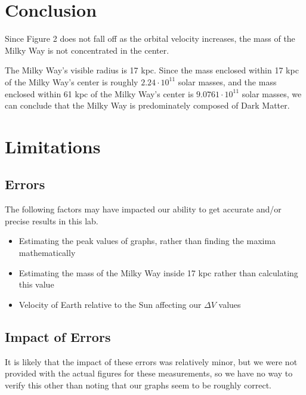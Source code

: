 \documentclass{article}
\begin{document}
\pagebreak

\section{Conclusion}

Since Figure 2 does not fall off as the orbital velocity increases, the mass of the Milky Way is not concentrated in the center.

The Milky Way's visible radius is 17 kpc.
Since the mass enclosed within 17 kpc of the Milky Way's center is roughly $2.24 \cdot 10^{11}$ solar masses, and the mass enclosed within 61 kpc of the Milky Way's center is $9.0761 \cdot 10^{11}$ solar masses, we can conclude that the Milky Way is predominately composed of Dark Matter.

\section{Limitations}

\subsection{Errors}
The following factors may have impacted our ability to get accurate and/or
precise results in this lab.

\begin{itemize}
    \item Estimating the peak values of graphs, rather than finding the maxima mathematically
    \item Estimating the mass of the Milky Way inside 17 kpc rather than calculating this value
    \item Velocity of Earth relative to the Sun affecting our $\Delta V$ values
\end{itemize}

\subsection{Impact of Errors}

It is likely that the impact of these errors was relatively minor, but we were not provided with the actual figures for these measurements, so we have no way to verify this other than noting that our graphs seem to be roughly correct.
\end{document}
